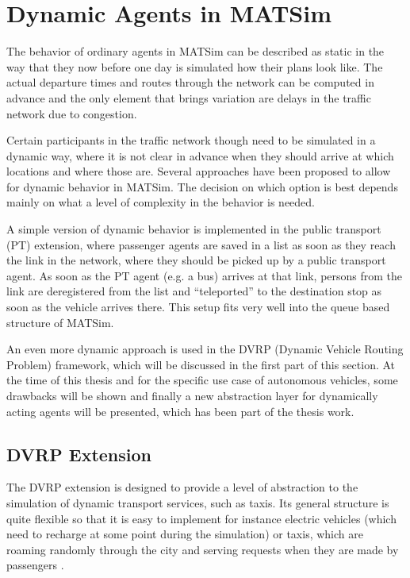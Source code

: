 \section{Dynamic Agents in MATSim}
\label{sec:dynagent}

The behavior of ordinary agents in MATSim can be described as static in the way
that they now before one day is simulated how their plans look like. The actual
departure times and routes through the network can be computed in advance and the
only element that brings variation are delays in the traffic network due to
congestion.

Certain participants in the traffic network though need to be simulated in a
dynamic way, where it is not clear in advance when they should arrive at which locations
and where those are. Several approaches have been proposed to allow for dynamic behavior in MATSim.
The decision on which option is best depends mainly on what a
level of complexity in the behavior is needed.

A simple version of dynamic behavior is implemented in the public transport (PT)
extension, where passenger agents are saved in a list as soon as they reach the
link in the network, where they should be picked up by a public transport agent.
As soon as the PT agent (e.g. a bus) arrives at that link, persons from the link
are deregistered from the list and ``teleported'' to the destination stop as soon
as the vehicle arrives there. This setup fits very well into the queue based structure
of MATSim.

An even more dynamic approach is used in the DVRP (Dynamic Vehicle Routing Problem) framework, which will be discussed
in the first part of this section. At the time of this thesis and for the specific
use case of autonomous vehicles, some drawbacks will be shown and finally a new
abstraction layer for dynamically acting agents will be presented, which has been
part of the thesis work.

\subsection{DVRP Extension}

The DVRP extension \citep{DVRP12, Horni2015} is designed to provide a level of abstraction to the simulation of
dynamic transport services, such as taxis. Its general structure is quite flexible
so that it is easy to implement for instance electric vehicles \citep{Bischoff2014} (which need to recharge
at some point during the simulation) or taxis, which are roaming randomly through
the city and serving requests when they are made by passengers \citep{Maciejewski2015}.

